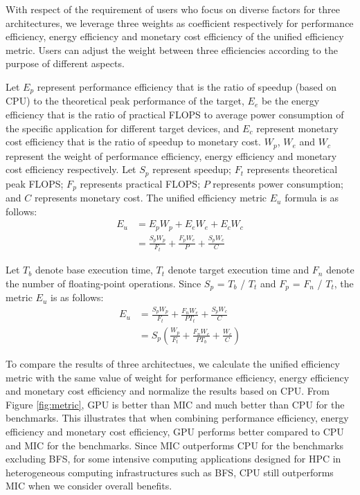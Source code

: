 
With respect of the requirement of users who focus on diverse factors for three architectures, we leverage three weights as coefficient respectively for performance efficiency, energy efficiency and monetary cost efficiency of the unified efficiency metric. Users can adjust the weight between three efficiencies according to the purpose of different aspects.

Let $E_{p}$ represent performance efficiency that is the ratio of speedup (based on CPU) to the theoretical peak performance of the target, $E_{e}$ be the energy efficiency that is the ratio of practical FLOPS to average power consumption of the specific application for different target devices, and $E_{c}$ represent monetary cost efficiency that is the ratio of speedup to monetary cost. $W_{p}$, $W_{e}$ and $W_{c}$ represent the weight of performance efficiency, energy efficiency and monetary cost efficiency respectively. Let $S_{p}$ represent speedup; $F_{t}$ represents theoretical peak FLOPS; $F_{p}$ represents practical FLOPS; $P$ represents power consumption; and $C$ represents monetary cost. The unified efficiency metric $E_{u}$ formula is as follows:
  \begin{equation}\label{equ:metric1}
    \begin{split}
  {E_{u}} &  = E_{p}W_{p}+E_{e}W_{e}+E_{c}W_{c} \\
   & = \frac{S_{p}W_{p}}{F_{t}}+\frac{F_{p}W_{e}}{P}+\frac{S_{p}W_{c}}{C}
  \end{split}
\end{equation}
  
Let $T_{b}$ denote base execution time, $T_{t}$ denote target execution time and $F_{n}$ denote the number of floating-point operations. Since $S_{p}$ = $T_{b}$ / $T_{t}$ and $F_{p}$ = $F_{n}$ / $T_{t}$, the metric $E_{u}$ is as follows:
  \begin{equation}\label{equ:metric1}
    \begin{split}
  {E_{u}} &  = \frac{S_{p}W_{p}}{F_{t}}+\frac{F_{n}W_{e}}{PT_{t}}+\frac{S_{p}W_{c}}{C} \\
   & = {S_{p}}(\frac{W_{p}}{F_{t}}+\frac{F_{n}W_{e}}{PT_{b}}+\frac{W_{c}}{C})
  \end{split}
\end{equation}

  
 To compare the results of three architectues, we calculate the unified efficiency metric with the same value of weight for performance efficiency, energy efficiency and monetary cost efficiency and normalize the results based on CPU. From Figure \ref{fig:metric}, GPU is better than MIC and much better than CPU for the benchmarks. This illustrates that when combining performance efficiency, energy efficiency and monetary cost efficiency, GPU performs better compared to CPU and MIC for the benchmarks. Since MIC outperforms CPU for the benchmarks excluding BFS, for some intensive computing applications designed for HPC in heterogeneous computing infrastructures such as BFS, CPU still outperforms MIC when we consider overall benefits.
